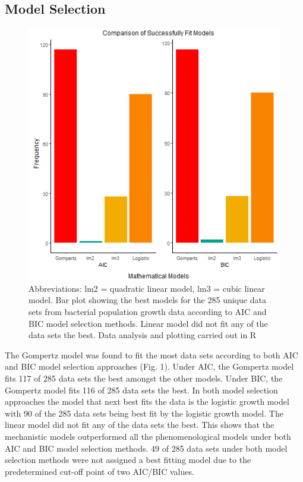 \documentclass[11pt]{article}
\begin{document}
    \subsection{Model Selection}
        \begin{figure}[h!]
	        \centering
  	    	\includegraphics[scale = 0.5]{images/fig_1.png}
  		    \caption{Abbreviations: lm2 = quadratic linear model, lm3 = cubic linear model. Bar plot showing the best models for the 285 unique data sets from bacterial population growth data according to AIC and BIC model selection methods. Linear model did not fit any of the data sets the best. Data analysis and plotting carried out in R}
  		    \label{Figure 1}
    	\end{figure}
    
    The Gompertz model was found to fit the most data sets according to both AIC and BIC model selection approaches (Fig. 1). Under AIC, the Gompertz model fits 117 of 285 data sets the best amongst the other models. Under BIC, the Gompertz model fits 116 of 285 data sets the best. In both model selection approaches the model that next best fits the data is the logistic growth model with 90 of the 285 data sets being best fit by the logistic growth model. The linear model did not fit any of the data sets the best. This shows that the mechanistic models outperformed all the phenomenological models under both AIC and BIC model selection methods. 49 of 285 data sets under both model selection methods were not assigned a best fitting model due to the predetermined cut-off point of two AIC/BIC values.
    
\end{document}
